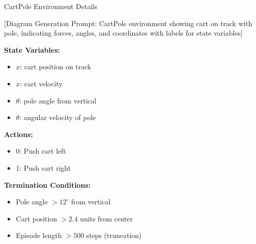 \documentclass[aspectratio=169,10pt]{beamer}
\begin{document}
\begin{frame}{CartPole Environment Details}

\begin{center}
[Diagram Generation Prompt: CartPole environment showing cart on track with pole, indicating forces, angles, and coordinates with labels for state variables]
\end{center}

\vfill

\textbf{State Variables:}
\begin{itemize}
    \item $x$: cart position on track
    \item $\dot{x}$: cart velocity  
    \item $\theta$: pole angle from vertical
    \item $\dot{\theta}$: angular velocity of pole
\end{itemize}

\vfill

\textbf{Actions:}
\begin{itemize}
    \item 0: Push cart left
    \item 1: Push cart right
\end{itemize}

\vfill

\textbf{Termination Conditions:}
\begin{itemize}
    \item Pole angle $> 12^\circ$ from vertical
    \item Cart position $> 2.4$ units from center
    \item Episode length $> 500$ steps (truncation)
\end{itemize}

\end{frame}
\end{document}
